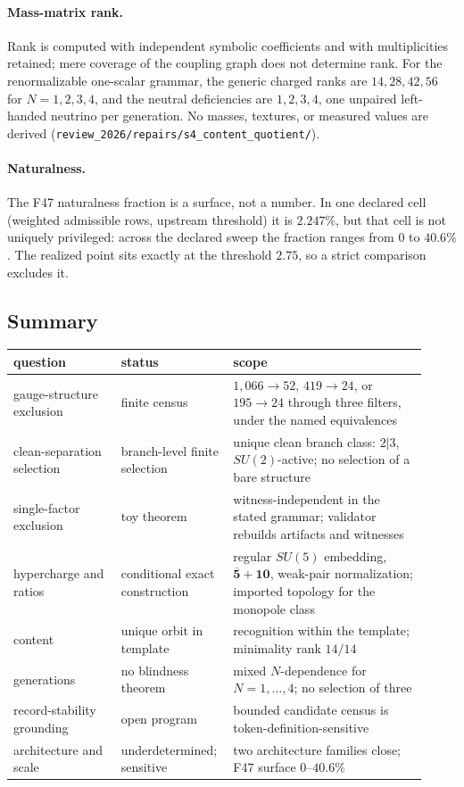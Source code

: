 \paragraph{Mass-matrix rank.} Rank is computed with independent symbolic coefficients and with multiplicities
retained; mere coverage of the coupling graph does not determine rank. For the renormalizable one-scalar grammar, the
generic charged ranks are \(14,28,42,56\) for \(N=1,2,3,4\), and the neutral deficiencies are \(1,2,3,4\), one unpaired
left-handed neutrino per generation. No masses, textures, or measured values are derived
(\nolinkurl{review_2026/repairs/s4_content_quotient/}).

\paragraph{Naturalness.} The F47 naturalness fraction is a surface, not a number. In one declared cell (weighted
admissible rows, upstream threshold) it is \(2.247\%\), but that cell is not uniquely privileged: across the declared
sweep the fraction ranges from \(0\) to \(40.6\%\). The realized point sits exactly at the threshold \(2.75\), so a
strict comparison excludes it.

\subsection{Summary}\label{result-sm-summary-table}

\begin{center}
\small
\begin{longtable}[]{@{}p{0.25\linewidth}p{0.22\linewidth}p{0.45\linewidth}@{}}
\toprule
question & status & scope\\
\midrule
\endhead
gauge-structure exclusion & finite census & \(1{,}066\to52\), \(419\to24\), or \(195\to24\) through three filters, under
the named equivalences\\
clean-separation selection & branch-level finite selection & unique clean branch class: \(2|3\), \(SU(2)\)-active; no
selection of a bare structure\\
single-factor exclusion & toy theorem & witness-independent in the stated grammar; validator rebuilds artifacts and
witnesses\\
hypercharge and ratios & conditional exact construction & regular \(SU(5)\) embedding,
\(\overline{\mathbf5}+\mathbf{10}\), weak-pair normalization; imported topology for the monopole class\\
content & unique orbit in template & recognition within the template; minimality rank \(14/14\)\\
generations & no blindness theorem & mixed \(N\)-dependence for \(N=1,\dots,4\); no selection of three\\
record-stability grounding & open program & bounded candidate census is token-definition-sensitive\\
architecture and scale & underdetermined; sensitive & two architecture families close; F47 surface \(0\)--\(40.6\%\)\\
\bottomrule
\end{longtable}
\end{center}
